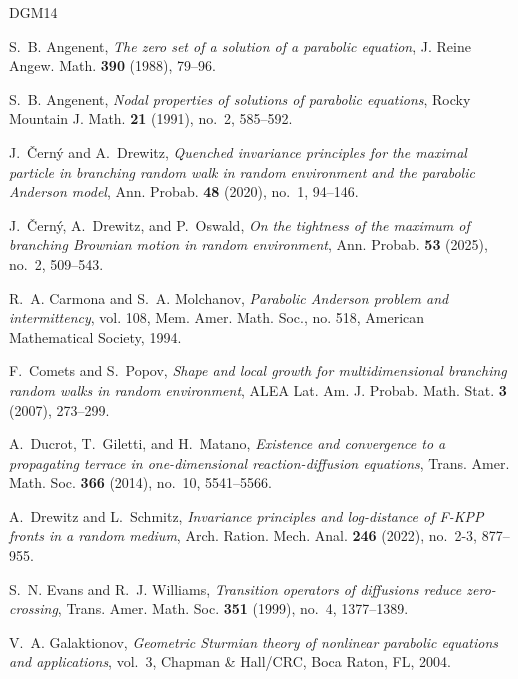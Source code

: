 \documentclass[12pt,reqno,oneside]{amsart}
\numberwithin{equation}{section}
\theoremstyle{definition}
\theoremstyle{remark}
\begin{document}
\providecommand{\arxiv}[1]{Preprint, available at \href{http://arxiv.org/abs/#1}{arXiv:#1}}
\begin{thebibliography}{DGM14}

S.~B. Angenent, \emph{The zero set of a solution of a parabolic equation}, J. Reine Angew. Math. \textbf{390} (1988), 79--96. 

S.~B. Angenent, \emph{Nodal properties of solutions of parabolic equations}, Rocky Mountain J. Math. \textbf{21} (1991), no.~2, 585--592. 

J.~{\v C}erný and A.~Drewitz, \emph{Quenched invariance principles for the maximal particle in branching random walk in random environment and the parabolic {A}nderson model}, Ann. Probab. \textbf{48} (2020), no.~1, 94--146. 

J.~{\v C}erný, A.~Drewitz, and P.~Oswald, \emph{On the tightness of the maximum of branching {B}rownian motion in random environment}, Ann. Probab. \textbf{53} (2025), no.~2, 509--543. 

R.~A. Carmona and S.~A. Molchanov, \emph{Parabolic {A}nderson problem and intermittency}, vol. 108, Mem. Amer. Math. Soc., no. 518, American Mathematical Society, 1994. 

F.~Comets and S.~Popov, \emph{Shape and local growth for multidimensional branching random walks in random environment}, ALEA Lat. Am. J. Probab. Math. Stat. \textbf{3} (2007), 273--299. 

A.~Ducrot, T.~Giletti, and H.~Matano, \emph{Existence and convergence to a propagating terrace in one-dimensional reaction-diffusion equations}, Trans. Amer. Math. Soc. \textbf{366} (2014), no.~10, 5541--5566. 

A.~Drewitz and L.~Schmitz, \emph{Invariance principles and log-distance of {F}-{KPP} fronts in a random medium}, Arch. Ration. Mech. Anal. \textbf{246} (2022), no.~2-3, 877--955. 

S.~N. Evans and R.~J. Williams, \emph{Transition operators of diffusions reduce zero-crossing}, Trans. Amer. Math. Soc. \textbf{351} (1999), no.~4, 1377--1389. 

V.~A. Galaktionov, \emph{Geometric {S}turmian theory of nonlinear parabolic equations and applications}, vol.~3, Chapman \& Hall/CRC, Boca Raton, FL, 2004. 


\end{thebibliography}
\end{document}
